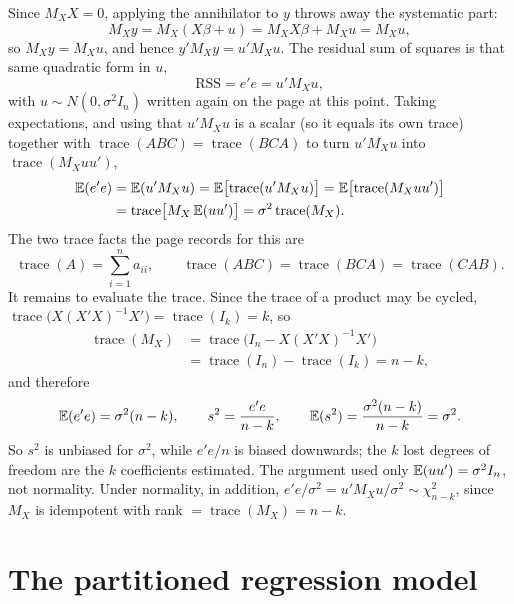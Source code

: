 \documentclass[11pt]{article}
\begin{document}
Since $M_{X}X = 0$, applying the annihilator to $y$ throws away the systematic
part:
\[ M_{X}y = M_{X}(X\beta + u) = M_{X}X\beta + M_{X}u = M_{X}u , \]
so $M_{X}y = M_{X}u$, and hence $y'M_{X}y = u'M_{X}u$. The residual sum of squares
is that same quadratic form in $u$,
\[ \text{RSS} = e'e = u'M_{X}u , \]
with $u \sim N(0,\sigma^{2}I_{n})$ written again on the page at this point. Taking
expectations, and using that $u'M_{X}u$ is a scalar (so it equals its own trace)
together with $\operatorname{trace}(ABC) = \operatorname{trace}(BCA)$ to turn
$u'M_{X}u$ into $\operatorname{trace}(M_{X}uu')$,
\[
\begin{aligned}
  \mathbb{E}(e'e) &= \mathbb{E}(u'M_{X}u) = \mathbb{E}\bigl[\operatorname{trace}(u'M_{X}u)\bigr]
            = \mathbb{E}\bigl[\operatorname{trace}(M_{X}uu')\bigr]\\
          &= \operatorname{trace}\bigl[M_{X}\,\mathbb{E}(uu')\bigr]
            = \sigma^{2}\operatorname{trace}(M_{X}).
\end{aligned}
\]
The two trace facts the page records for this are
\[ \operatorname{trace}(A) = \sum_{i=1}^{n} a_{ii}, \qquad
   \operatorname{trace}(ABC) = \operatorname{trace}(BCA) = \operatorname{trace}(CAB). \]
It remains to evaluate the trace. Since the trace of a product may be cycled,
$\operatorname{trace}\bigl(X(X'X)^{-1}X'\bigr) = \operatorname{trace}(I_{k}) = k$,
so
\[
\begin{aligned}
  \operatorname{trace}(M_{X}) &= \operatorname{trace}\bigl(I_{n} - X(X'X)^{-1}X'\bigr)\\
  &= \operatorname{trace}(I_{n}) - \operatorname{trace}(I_{k}) = n - k ,
\end{aligned}
\]
and therefore
\[ \mathbb{E}(e'e) = \sigma^{2}(n-k), \qquad
   s^{2} = \frac{e'e}{n-k}, \qquad
   \mathbb{E}(s^{2}) = \frac{\sigma^{2}(n-k)}{n-k} = \sigma^{2}. \]
So $s^{2}$ is unbiased for $\sigma^{2}$, while $e'e/n$ is biased downwards; the $k$
lost degrees of freedom are the $k$ coefficients estimated. The argument used only
$\mathbb{E}(uu') = \sigma^{2}I_{n}$, not normality. Under normality, in addition,
$e'e/\sigma^{2} = u'M_{X}u/\sigma^{2} \sim \chi^{2}_{n-k}$, since $M_{X}$ is
idempotent with rank $= \operatorname{trace}(M_{X}) = n-k$.

\section{The partitioned regression model}
\end{document}
